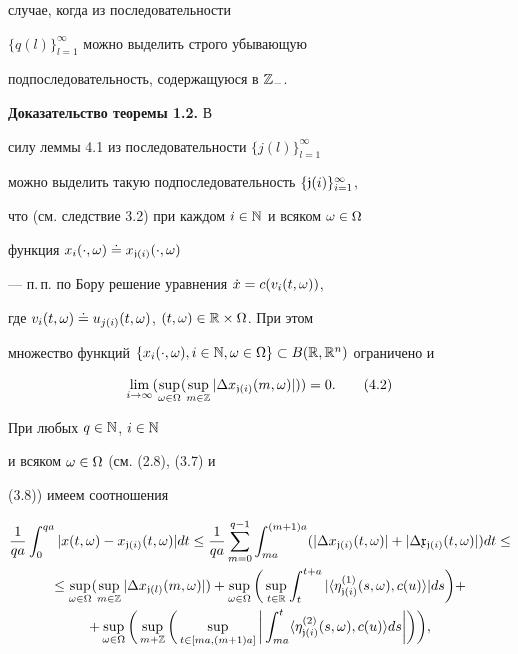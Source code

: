 случае, когда из последовательности


$\{q(l)\}_{l=1}^{\infty}$ можно выделить строго убывающую


подпоследовательность, содержащуюся в $\Bbb Z_-$.


\medskip





{\bf Доказательство теоремы 1.2.} В


силу леммы 4.1 из последовательности $\{j(l)\}_{l=1}^{\infty}$


можно выделить такую подпоследовательность $\{\frak j(i)\}_{i=1}^{\infty}$,


что (см. следствие 3.2) при каждом $i\in\Bbb N$ и всяком $\omega\in\Omega$


функция $x_i(\cdot,\omega)\doteq x_{\frak j(i)}(\cdot,\omega)$


--- п.\,п. по Бору решение уравнения $\Dot x=c(v_i(t,\omega))$,


где $v_i(t,\omega)\doteq u_{j(i)}(t,\omega)$, $(t,\omega)\in\Bbb R\times\Omega$. При этом


множество функций $\{x_i(\cdot,\omega),i\in\Bbb N,\mm\}\subset


B(\Bbb R,\Bbb R^n)$ ограничено и


\begin{equation}


\lim\limits_{i\to\infty}(\sup\limits_{\mm}


(\sup\limits_{m\in\Bbb Z}|\Delta x_{\gj(i)}(m,\omega)|))=0. \tag{4.2}


\end{equation}


При любых $q\in\Bbb N$, $i\in\Bbb N$


и всяком $\omega\in\Omega$ (см. (2.8), (3.7) и


(3.8)) имеем соотношения


\begin{multline*}


\frac{1}{qa}\int_0^{qa}


|x\tm-x_{\gj(i)}\tm|dt\le\frac{1}{qa}


\sum\limits_{m=0}^{q-1}\int_{ma}^{(m+1)a}


(|\Delta x_{\gj(i)}\tm|+|\Delta \frak x_{\gj(i)}\tm|) dt\le \\


%


\le\sup\limits_{\mm}(\sup\limits_{m\in\Bbb Z}|\Delta


x_{\gj(l)}(m,\omega)|)+


\sup\limits_{\mm}\bigg(\sup\limits_{t\in\Bbb R}\int_t^{t+a}|\la


\eta_{\gj(i)}^{(1)}(s,\omega),c(u)\ra |ds\bigg)+ \\


%


+\sup\limits_{\mm}\bigg(\sup\limits_{m+\Bbb Z}


\bigg(\sup\limits_{t\in[ma,(m+1)a]}\bigg|\int_{ma}^t\la


\eta_{\gj(i)}^{(2)}(s,\omega), c(u)\ra ds\bigg|\bigg)\bigg),


\end{multline*}


